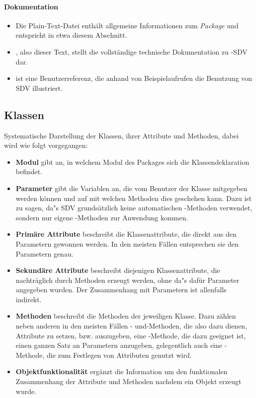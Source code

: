 \paragraph{Dokumentation}

\begin{itemize}
\item Die Plain-Text-Datei  enth\"alt allgemeine
Informationen zum \textit{Package} und entspricht in etwa
diesem Abschnitt.

\item {}, also dieser Text, stellt die vollst\"andige 
technische Dokumentation zu -SDV dar. 

\item {} ist eine Benutzerreferenz, die anhand
von Beispielaufrufen die Benutzung von SDV illustriert.
\end{itemize}

\subsection{Klassen}
Systematische Darstellung der Klassen, ihrer Attribute und Methoden,
dabei wird wie folgt vorgegangen:
\begin{itemize}
\item \textbf{Modul} gibt an, in welchem Modul des Packages sich die
  Klassendeklaration befindet.
\item \textbf{Parameter} gibt die Variablen an, die vom Benutzer der
  Klasse mitgegeben werden k\"onnen und auf mit welchen Methoden dies
  geschehen kann. Dazu ist zu sagen, da"s SDV grunds\"atzlich keine
  automatischen -Methoden verwendet, sondern
  nur eigene -Methoden zur Anwendung kommen.
\item \textbf{Prim\"are Attribute} beschreibt die Klassenattribute,
  die direkt aus den Parametern gewonnen werden. In den meisten
  F\"allen entsprechen sie den Parametern genau.
\item \textbf{Sekund\"are Attribute} beschreibt diejenigen
  Klassenattribute, die nachtr\"aglich durch Methoden erzeugt werden,
  ohne da"s daf\"ur Parameter angegeben wurden. Der Zusammenhang mit
  Parametern ist allenfalls indirekt.
\item \textbf{Methoden} beschreibt die Methoden der jeweiligen Klasse.
  Dazu z\"ahlen neben anderen in den meisten F\"allen -
  und-Methoden, die also dazu dienen, Attribute zu
  setzen, bzw. auszugeben, eine -Methode, die dazu
  geeignet ist, einen ganzen Satz an Parametern anzugeben,
  gelegentlich auch eine -Methode, die zum Festlegen
  von Attributen genutzt wird.
\item \textbf{Objektfunktionalit\"at} erg\"anzt die Information um den
  funktionalen Zusammenhang der Attribute und Methoden nachdem ein
  Objekt erzeugt wurde.
\end{itemize}


